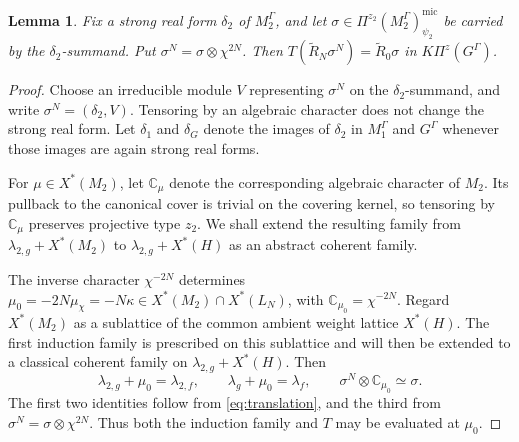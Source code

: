 \documentclass[10pt]{amsart}
\numberwithin{equation}{section}
\theoremstyle{plain}
\newtheorem{lemma}[proposition]{Lemma}
\theoremstyle{definition}
\theoremstyle{remark}
\newcommand{\CC}{\mathbb C}
\newcommand{\mic}{\mathrm{mic}}
\begin{document}
\begin{lemma}\label{lem:coherent-family}
Fix a strong real form $\delta_2$ of $M_2^\Gamma$, and let
$\sigma\in\Pi^{z_2}(M_2^\Gamma)^{\mic}_{\psi_2}$
be carried by the $\delta_2$-summand. Put
$\sigma^N=\sigma\otimes\chi^{2N}$. Then
$T(\widetilde R_N\sigma^N)=\widetilde R_0\sigma$ in
$K\Pi^z(G^\Gamma)$.
\end{lemma}

\begin{proof}
Choose an irreducible module $V$ representing $\sigma^N$ on the
$\delta_2$-summand, and write $\sigma^N=(\delta_2,V)$. Tensoring by an
algebraic character does not change the strong real form. Let $\delta_1$
and $\delta_G$ denote the
images of $\delta_2$ in $M_1^\Gamma$ and $G^\Gamma$ whenever those images
are again strong real forms.

For $\mu\in X^*(M_2)$, let $\CC_\mu$ denote the corresponding algebraic
character of $M_2$. Its pullback to the canonical cover is trivial on the
covering kernel, so tensoring by $\CC_\mu$ preserves projective type
$z_2$. We shall extend the resulting family from
$\lambda_{2,g}+X^*(M_2)$ to $\lambda_{2,g}+X^*(H)$ as an abstract
coherent family.

The inverse character $\chi^{-2N}$ determines
$\mu_0=-2N\mu_\chi=-N\kappa\in X^*(M_2)\cap X^*(L_N)$, with
$\CC_{\mu_0}=\chi^{-2N}$.
Regard $X^*(M_2)$ as a sublattice of the common ambient weight lattice
$X^*(H)$. The first induction family is prescribed on this sublattice and
will then be extended to a classical coherent family on
$\lambda_{2,g}+X^*(H)$.
Then
\begin{equation}\label{eq:source-target-shift}
 \lambda_{2,g}+\mu_0=\lambda_{2,f},
 \qquad
 \lambda_g+\mu_0=\lambda_f,
 \qquad
 \sigma^N\otimes\CC_{\mu_0}\simeq\sigma.
\end{equation}
The first two identities follow from \eqref{eq:translation}, and the third
from $\sigma^N=\sigma\otimes\chi^{2N}$. Thus both the induction family and
$T$ may be evaluated at $\mu_0$.


\end{proof}
\end{document}
